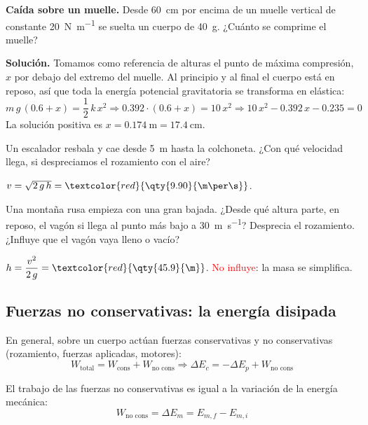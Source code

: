 \begin{example}
    \textbf{Caída sobre un muelle.} Desde \qty{60}{\cm} por encima de un muelle vertical de constante \qty{20}{\newton\per\m} se suelta
    un cuerpo de \qty{40}{\g}. ¿Cuánto se comprime el muelle?

    \textbf{Solución.} Tomamos como referencia de alturas el punto de máxima compresión, \(x\) por debajo del extremo del muelle. Al
    principio y al final el cuerpo está en reposo, así que toda la energía potencial gravitatoria se transforma en elástica:
    \[ m\,g\,(\num{0.6} + x) = \frac{1}{2}\,k\,x^2 \Rightarrow \num{0.392} \cdot (\num{0.6} + x) = 10\,x^2 \Rightarrow 10\,x^2 - \num{0.392}\,x - \num{0.235} = 0 \]
    La solución positiva es \(x = \qty{0.174}{\m} = \qty{17.4}{\cm}\).
\end{example}

\begin{exercise}
    Un escalador resbala y cae desde \qty{5}{\m} hasta la colchoneta. ¿Con qué velocidad llega, si despreciamos el rozamiento con el aire?
    \begin{solu}
        \(v = \sqrt{2\,g\,h} = \textcolor{red}{\qty{9.90}{\m\per\s}}\).
    \end{solu}
\end{exercise}

\begin{exercise}
    Una montaña rusa empieza con una gran bajada. ¿Desde qué altura parte, en reposo, el vagón si llega al punto más bajo a
    \qty{30}{\m\per\s}? Desprecia el rozamiento. ¿Influye que el vagón vaya lleno o vacío?
    \begin{solu}
        \(h = \dfrac{v^2}{2\,g} = \textcolor{red}{\qty{45.9}{\m}}\). \textcolor{red}{No influye}: la masa se simplifica.
    \end{solu}
\end{exercise}

\subsection{Fuerzas no conservativas: la energía disipada}

En general, sobre un cuerpo actúan fuerzas conservativas y no conservativas (rozamiento, fuerzas aplicadas, motores):
\[ W_{\text{total}} = W_{\text{cons}} + W_{\text{no cons}} \Rightarrow \Delta E_c = -\Delta E_p + W_{\text{no cons}} \]

\begin{definition}
    El trabajo de las fuerzas no conservativas es igual a la variación de la energía mecánica:
    \[ W_{\text{no cons}} = \Delta E_m = E_{m,f} - E_{m,i} \]
\end{definition}

